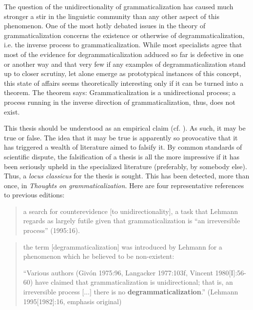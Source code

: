 The question of the unidirectionality of grammaticalization has caused much stronger a stir in the linguistic community than any other aspect of this phenomenon. One of the most hotly debated issues in the theory of grammaticalization concerns the existence or otherwise of degrammaticalization, i.e. the inverse process to grammaticalization. While most specialists agree that most of the evidence for degrammaticalization adduced so far is defective in one or another way and that very few if any examples of degrammaticalization stand up to closer scrutiny, let alone emerge as prototypical instances of this concept, this state of affairs seems theoretically interesting only if it can be turned into a theorem. The theorem says: Grammaticalization is a unidirectional process; a process running in the inverse direction of grammaticalization, thus, does not exist.

This thesis should be understood as an empirical claim (cf. \citealt[§4.2]{Lehmann2004}). As such, it may be true or false. The idea that it may be true is apparently so provocative that it has triggered a wealth of literature aimed to falsify it. By common standards of scientific dispute, the falsification of a thesis is all the more impressive if it has been seriously upheld in the specialized literature (preferably, by somebody else). Thus, a \textit{locus classicus} for the thesis is sought. This has been detected, more than once, in \textit{Thoughts on grammaticalization}. Here are four representative references to previous editions:

\begin{quote}
a search for counterevidence [to unidirectionality], a task that Lehmann regards as largely futile given that grammaticalization is “an irreversible process” (1995:16).

\citep[569]{Howe2010}
\end{quote}

\begin{quote}
the term [degrammaticalization] was introduced by Lehmann for a phenomenon which he believed to be non-existent:

``Various authors (Givón 1975:96, Langacker 1977:103f, Vincent 1980[I]:56-60) have claimed that grammaticalization is unidirectional; that is, an irreversible process [...] there is no \textbf{degrammaticalization}.” (Lehmann 1995[1982]:16, emphasis original)

\citep[123]{Norde2010}
\end{quote}

